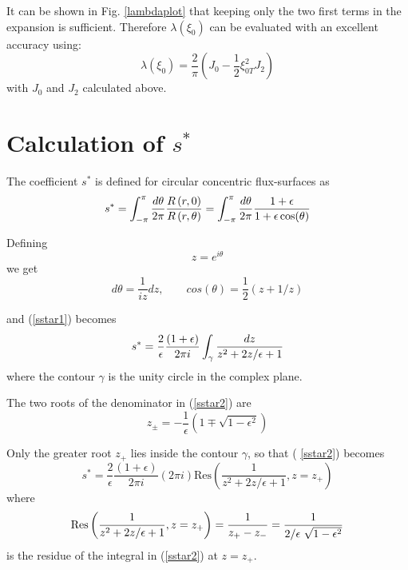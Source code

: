 It can be shown in Fig. \ref{lambdaplot} that keeping only the two first
terms in the expansion is sufficient. Therefore $\lambda (\xi _{0})$ can be
evaluated with an excellent accuracy using:
\begin{equation}
\lambda (\xi _{0})=\frac{2}{\pi }\left( J_{0}-\frac{1}{2}\xi
_{0T}^{2}J_{2}\right)   \label{lambda4}
\end{equation}
with $J_{0}$ and $J_{2}$ calculated above.


\section{Calculation of $s^{\ast}$}

The coefficient $s^{*}$ is defined for circular concentric flux-surfaces as
\begin{equation}
s^{*}=\int_{-\pi }^{\pi }\frac{d\theta }{2\pi }\frac{R\left( r,0\right) }{%
R\left( r,\theta \right) }=\int_{-\pi }^{\pi }\frac{d\theta }{2\pi }\frac{%
1+\epsilon }{1+\epsilon \cos (\theta )}  \label{sstar1}
\end{equation}

Defining
\begin{equation}
z = e^{i\theta}
\end{equation}
we get
\begin{equation}
d\theta = \frac{1}{iz} dz, \qquad cos(\theta) = \frac{1}{2}(z+1/z)
\end{equation}

and (\ref{sstar1}) becomes
\begin{equation}
s^{*}=\frac{2}{\epsilon }\frac{(1+\epsilon )}{2\pi i}\int_{\gamma }\frac{dz}{%
z^{2}+2z/\epsilon +1}  \label{sstar2}
\end{equation}
where the contour $\gamma $ is the unity circle in the complex plane.

The two roots of the denominator in (\ref{sstar2}) are
\begin{equation}
z_{\pm} = -\frac{1}{\epsilon}(1\mp\sqrt{1-\epsilon^2})
\end{equation}

Only the greater root $z_{+}$ lies inside the contour $\gamma $, so that (%
\ref{sstar2}) becomes
\begin{equation}
s^{*}=\frac{2}{\epsilon }\frac{(1+\epsilon )}{2\pi i}(2\pi i)\text{Res}%
\left( \frac{1}{z^{2}+2z/\epsilon +1},z=z_{+}\right)  \label{sstar3}
\end{equation}
where
\begin{equation}
\text{Res}\left( \frac{1}{z^{2}+2z/\epsilon +1},z=z_{+}\right) =\frac{1}{%
z_{+}-z_{-}}=\frac{1}{2/\epsilon \ \sqrt{1-\epsilon ^{2}}}  \label{sstar4}
\end{equation}
is the residue of the integral in (\ref{sstar2}) at $z=z_{+}$.

